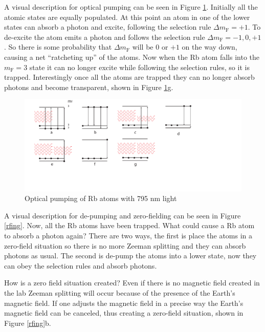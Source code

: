 A visual description for optical pumping can be seen in Figure \ref{pumping}. Initially all the atomic states are equally populated. At this point an atom in one of the lower states can absorb  a photon and excite, following the selection rule $\Delta m_{\mathrm{F}} = +1$. To de-excite the atom emits a photon and follows the selection rule $\Delta m_{\mathrm{F}} = -1, 0, +1$. So there is some probability that $\Delta m_{\mathrm{F}}$ will be 0 or $+1$ on the way down, causing a net ``ratcheting up'' of the atoms. Now when the Rb atom falls into the $m_{\mathrm{F}} = 3$ state it can no longer excite while following the selection rules, so it is trapped. Interestingly once all the atoms are trapped they can no longer absorb photons and become transparent, shown in  Figure \ref{pumping}g.
\begin{figure}[H]
  \includegraphics{figs/pumping}
  \caption{Optical pumping of Rb atoms with 795 nm light}
  \label{pumping}
\end{figure}

A visual description for de-pumping and zero-fielding can be seen in Figure \ref{rfing}. Now, all the Rb atoms have been trapped. What could cause a Rb atom to   absorb a photon again? There are two ways, the first is place the atoms in a zero-field situation so there is no more Zeeman splitting and they can absorb photons as usual. The second is de-pump the atoms into a lower state, now they can obey the selection rules and absorb photons.

How is a zero field situation created? Even if there is no magnetic field created in the lab Zeeman splitting will  occur because of the presence of the Earth's magnetic field. If one adjusts the magnetic field in a precise way the Earth's magnetic field can be canceled, thus creating a zero-field situation, shown in Figure \ref{rfing}b. 

